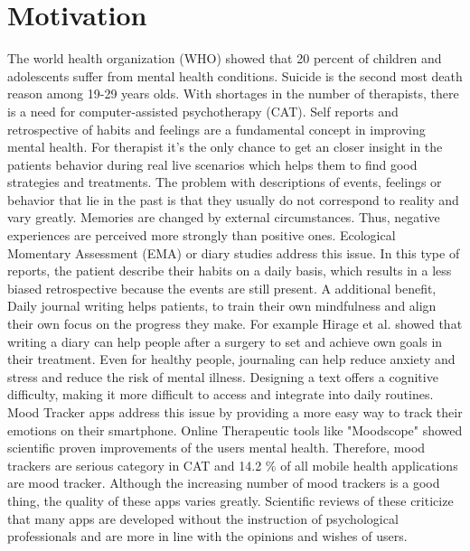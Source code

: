 \chapter{Motivation}
The world health organization (WHO) showed that 20 percent of children and adolescents suffer from mental health conditions. Suicide is the second most death reason among 19-29 years olds\cite{who}.
With shortages in the number of therapists, there is a need for computer-assisted psychotherapy (CAT). 
Self reports and retrospective of habits and feelings are a fundamental concept in improving mental health.
For therapist it's the only chance to get an closer insight in the patients behavior during real live scenarios which helps them to find good strategies and treatments.
The problem with descriptions of events, feelings or behavior that lie in the past is that they usually do not correspond to reality and vary greatly. 
Memories are changed by external circumstances. Thus, negative experiences are perceived more strongly than positive ones\cite{bradburn1987answering}.
Ecological Momentary Assessment (EMA) or diary studies address this issue\cite{shiffman2008ecological}.
In this type of reports, the patient describe their habits on a daily basis, which results in a less biased retrospective because the events are still present.
A additional benefit, Daily journal writing helps patients, to train their own mindfulness and align their own focus on the progress they make. For example Hirage et al. showed that writing a diary can help people after a surgery to set and achieve own goals in their treatment\cite{hiraga2019effects}.
Even for healthy people, journaling can help reduce anxiety and stress and reduce the risk of mental illness.
Designing a text offers a cognitive difficulty, making it more difficult to access and integrate into daily routines.
Mood Tracker apps address this issue by providing a more easy way to track their emotions on their smartphone. 
Online Therapeutic tools like "Moodscope" showed scientific proven improvements of the users mental health\cite{drake2013assessing}. Therefore, mood trackers are serious category in CAT and 14.2 \% of all mobile health applications are mood tracker.
Although the increasing number of mood trackers is a good thing, the quality of these apps varies greatly. 
Scientific reviews of these criticize that many apps are developed without the instruction of psychological professionals and are more in line with the opinions and wishes of users\cite{caldeira_mobile_nodate}\cite{schueller2021understanding}.
